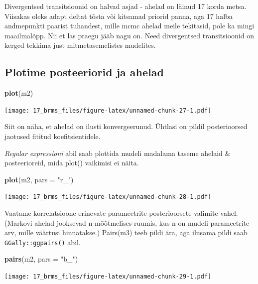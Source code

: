 \documentclass[]{book}
\newenvironment{Shaded}{\begin{snugshade}}{\end{snugshade}}
\newcommand{\KeywordTok}[1]{\textcolor[rgb]{0.13,0.29,0.53}{\textbf{#1}}}
\newcommand{\DataTypeTok}[1]{\textcolor[rgb]{0.13,0.29,0.53}{#1}}
\newcommand{\StringTok}[1]{\textcolor[rgb]{0.31,0.60,0.02}{#1}}
\newcommand{\NormalTok}[1]{#1}
\begin{document}
Divergentsed transitsioonid on halvad asjad - ahelad on läinud 17 korda
metsa. Viisakas oleks adapt deltat tõsta või kitsamad priorid panna, aga
17 halba andmepunkti paarist tuhandest, mille mcmc ahelad meile
tekitasid, pole ka mingi maailmalõpp. Nii et las praegu jääb nagu on.
Need divergentsed transitsioonid on kerged tekkima just
mitmetasemelistes mudelites.

\subsection{Plotime posteeriorid ja
ahelad}\label{plotime-posteeriorid-ja-ahelad}

\begin{Shaded}
\begin{Highlighting}[]
\KeywordTok{plot}\NormalTok{(m2)}
\end{Highlighting}
\end{Shaded}

\texttt{[image: 17\_brms\_files/figure-latex/unnamed-chunk-27-1.pdf]}

Siit on näha, et ahelad on ilusti konvergeerunud. Ühtlasi on pildil
posterioorsed jaotused fititud koefitsientidele.

\emph{Regular expressioni} abil saab plottida mudeli madalama taseme
ahelaid \& posteerioreid, mida plot() vaikimisi ei näita.

\begin{Shaded}
\begin{Highlighting}[]
\KeywordTok{plot}\NormalTok{(m2, }\DataTypeTok{pars =} \StringTok{"r_"}\NormalTok{)}
\end{Highlighting}
\end{Shaded}

\texttt{[image: 17\_brms\_files/figure-latex/unnamed-chunk-28-1.pdf]}

Vaatame korrelatsioone erinevate parameetrite posterioorsete valimite
vahel. (Markovi ahelad jooksevad n-mõõtmelises ruumis, kus n on mudeli
parameetrite arv, mille väärtusi hinnatakse.) Pairs(m3) teeb pildi ära,
aga ilusama pildi saab \texttt{GGally::ggpairs()} abil.

\begin{Shaded}
\begin{Highlighting}[]
\KeywordTok{pairs}\NormalTok{(m2, }\DataTypeTok{pars =} \StringTok{"b_"}\NormalTok{)}
\end{Highlighting}
\end{Shaded}

\texttt{[image: 17\_brms\_files/figure-latex/unnamed-chunk-29-1.pdf]}
\end{document}
